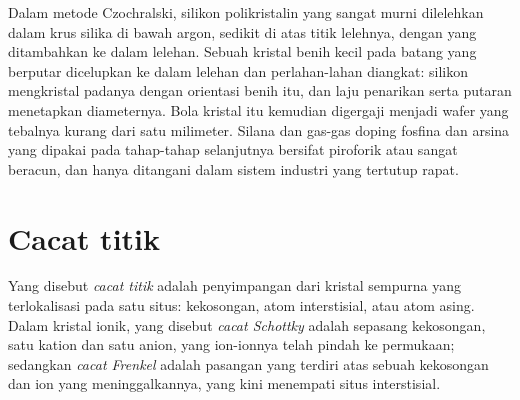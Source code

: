 \begin{inthelab}
Dalam metode Czochralski, silikon polikristalin yang sangat murni dilelehkan dalam
krus silika di bawah argon, sedikit di atas titik lelehnya, dengan
 yang ditambahkan ke dalam lelehan. Sebuah kristal benih kecil pada batang yang berputar dicelupkan ke dalam
lelehan dan perlahan-lahan diangkat: silikon mengkristal padanya dengan orientasi
benih itu, dan laju penarikan serta putaran menetapkan diameternya. Bola kristal
itu kemudian digergaji menjadi wafer yang tebalnya kurang dari satu milimeter. Silana dan gas-gas
doping fosfina dan arsina yang dipakai pada tahap-tahap selanjutnya bersifat piroforik atau sangat beracun,
dan hanya ditangani dalam sistem industri yang tertutup rapat.
\end{inthelab}

\section{Cacat titik}

\begin{definition}\label{def:b3:solid-state:defects}
Yang disebut \emph{cacat titik} adalah penyimpangan dari kristal sempurna
yang terlokalisasi pada satu situs: kekosongan, atom interstisial, atau atom
asing. Dalam kristal ionik, yang disebut \emph{cacat Schottky} adalah
sepasang kekosongan, satu kation dan satu anion, yang ion-ionnya telah pindah ke
permukaan; sedangkan \emph{cacat Frenkel} adalah pasangan yang terdiri atas
sebuah kekosongan dan ion yang meninggalkannya, yang kini menempati situs interstisial.
\end{definition}

